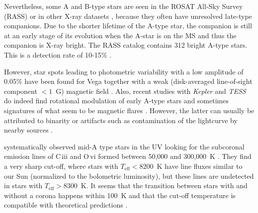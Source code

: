 \documentclass[linenumbers]{aastex631}
\begin{document}
Nevertheless, some A and B-type stars  are seen in the ROSAT
All-Sky Survey (RASS) or in other X-ray datasets \citep{2020ApJ...902..114W}, because they often have unresolved late-type
companions. Due to the shorter lifetime of the A-type star, the companion is
still at an early stage of its evolution when the A-star is on the MS and thus the companion is X-ray bright. The RASS
catalog contains 312 bright A-type stars. This is a detection rate of 10-15\% \citep{2007A&A...475..677S}. 


However, star spots leading to photometric variability with a low amplitude of 0.05\% have been found for Vega \citep{2015A&A...577A..64B} together with a weak (disk-averaged line-of-sight component $< 1$~G) magnetic field \citep{2009A&A...500L..41L,2010A&A...523A..41P}.
Also, recent studies with \emph{Kepler} and \emph{TESS} do indeed find rotational modulation of early A-type stars \citep{2011MNRAS.415.1691B,2017MNRAS.467.1830B,
2019MNRAS.487.4695S} and sometimes signatures of what seem to be magnetic flares \citep{2012MNRAS.423.3420B}. However, the latter can usually be attributed to binarity or artifacts such as contamination of the lightcurve by nearby sources \citep{2017MNRAS.466.3060P}.

\cite{2002ApJ...579..800S} systematically observed mid-A type stars in the UV
looking for the subcoronal emission lines
of C\,{\sc iii} and O\,{\sc vi} formed between 50,000 and 300,000~K \citep{1997A&AS..125..149D,2021ApJ...909...38D}. They find a
very sharp cut-off, where stars with $T_\mathrm{eff}<8200$~K have line fluxes similar to our Sun (normalized to the bolometric
luminosity), but these lines are undetected in stars with $T_\mathrm{eff} > 8300$~K. It seems that the
transition between stars with and without a corona happens within 100~K and that the cut-off temperature is compatible with theoretical predictions \citep{2000ASPC..210..187C,2002MNRAS.330L...6K}.
\end{document}
